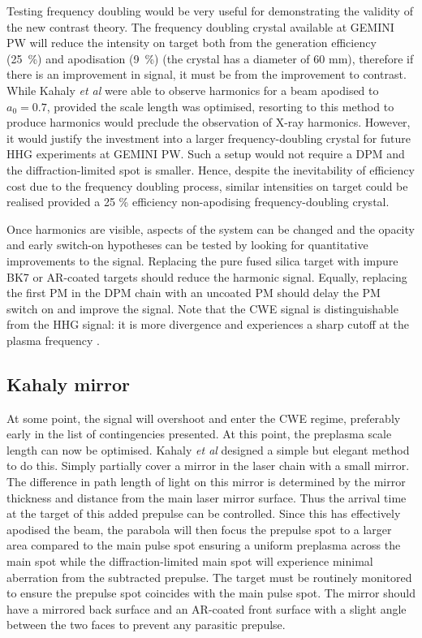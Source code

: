 Testing frequency doubling would be very useful for demonstrating the validity of the new contrast theory. The frequency doubling crystal available at GEMINI PW will reduce the intensity on target both from the generation efficiency (\qty{25}{\%}) and apodisation (\qty{9}{\%}) (the crystal has a diameter of 60 mm), therefore if there is an improvement in signal, it must be from the improvement to contrast. While Kahaly \textit{et al} were able to observe harmonics for a beam apodised to $a_0 = 0.7$, provided the scale length was optimised, resorting to this method to produce harmonics would preclude the observation of X-ray harmonics. However, it would justify the investment into a larger frequency-doubling crystal for future HHG experiments at GEMINI PW. Such a setup would not require a DPM and the diffraction-limited spot is smaller. Hence, despite the inevitability of efficiency cost due to the frequency doubling process, similar intensities on target could be realised provided a 25 \% efficiency non-apodising frequency-doubling crystal.

Once harmonics are visible, aspects of the system can be changed and the opacity and early switch-on hypotheses can be tested by looking for quantitative improvements to the signal. Replacing the pure fused silica target with impure BK7 or AR-coated targets should reduce the harmonic signal. Equally, replacing the first PM in the DPM chain with an uncoated PM should delay the PM switch on and improve the signal. Note that the CWE signal is distinguishable from the HHG signal: it is more divergence and experiences a sharp cutoff at the plasma frequency \cite{kahalyDirectObservationDensityGradient2013}.

\subsection{Kahaly mirror}
At some point, the signal will overshoot and enter the CWE regime, preferably early in the list of contingencies presented. At this point, the preplasma scale length can now be optimised. Kahaly \textit{et al} \cite{kahalyDirectObservationDensityGradient2013} designed a simple but elegant method to do this. Simply partially cover a mirror in the laser chain with a small mirror. The difference in path length of light on this mirror is determined by the mirror thickness and distance from the main laser mirror surface. Thus the arrival time at the target of this added prepulse can be controlled. Since this has effectively apodised the beam, the parabola will then focus the prepulse spot to a larger area compared to the main pulse spot ensuring a uniform preplasma across the main spot while the diffraction-limited main spot will experience minimal aberration from the subtracted prepulse. The target must be routinely monitored to ensure the prepulse spot coincides with the main pulse spot. The mirror should have a mirrored back surface and an AR-coated front surface with a slight angle between the two faces to prevent any parasitic prepulse.

